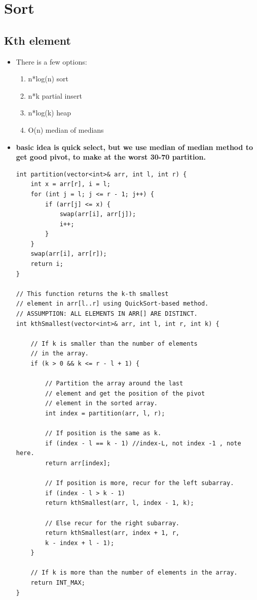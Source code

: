 \documentclass[a4paper,11pt,twoside]{book}
\begin{document}
\section{Sort}
\subsection{Kth element}
\begin{itemize}
	\item There is a few options:
	\begin{enumerate}
		\item n*log(n) sort
		\item n*k partial insert 
		\item n*log(k) heap 
		\item O(n) median of medians 
	\end{enumerate}

	\item \textbf{basic idea is quick select, but we use median of median method to get good pivot, to make at the worst 30-70 partition.}
	
\begin{lstlisting}
int partition(vector<int>& arr, int l, int r) {
	int x = arr[r], i = l;
	for (int j = l; j <= r - 1; j++) {
		if (arr[j] <= x) {
			swap(arr[i], arr[j]);
			i++;
		}
	}
	swap(arr[i], arr[r]);
	return i;
}

// This function returns the k-th smallest 
// element in arr[l..r] using QuickSort-based method.
// ASSUMPTION: ALL ELEMENTS IN ARR[] ARE DISTINCT.
int kthSmallest(vector<int>& arr, int l, int r, int k) {
	
	// If k is smaller than the number of elements
	// in the array.
	if (k > 0 && k <= r - l + 1) {
		
		// Partition the array around the last 
		// element and get the position of the pivot 
		// element in the sorted array.
		int index = partition(arr, l, r);
		
		// If position is the same as k.
		if (index - l == k - 1) //index-L, not index -1 , note here. 
		return arr[index];
		
		// If position is more, recur for the left subarray.
		if (index - l > k - 1) 
		return kthSmallest(arr, l, index - 1, k);
		
		// Else recur for the right subarray.
		return kthSmallest(arr, index + 1, r, 
		k - index + l - 1);
	}
	
	// If k is more than the number of elements in the array.
	return INT_MAX;
}
\end{lstlisting}
	

\end{itemize}
\end{document}
